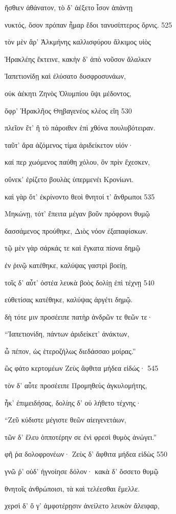 ἤσθιεν ἀθάνατον, τὸ δ' ἀέξετο ἶσον ἁπάντῃ 

νυκτός, ὅσον πρόπαν ἦμαρ ἔδοι τανυσίπτερος ὄρνις. 525 

τὸν μὲν ἄρ' Ἀλκμήνης καλλισφύρου ἄλκιμος υἱὸς

Ἡρακλέης ἔκτεινε, κακὴν δ' ἀπὸ νοῦσον ἄλαλκεν

Ἰαπετιονίδῃ καὶ ἐλύσατο δυσφροσυνάων, 

οὐκ ἀέκητι Ζηνὸς Ὀλυμπίου ὕψι μέδοντος,

ὄφρ' Ἡρακλῆος Θηβαγενέος κλέος εἴη 530

πλεῖον ἔτ' ἢ τὸ πάροιθεν ἐπὶ χθόνα πουλυβότειραν.

ταῦτ' ἄρα ἁζόμενος τίμα ἀριδείκετον υἱόν·

καί περ χωόμενος παύθη χόλου, ὃν πρὶν ἔχεσκεν,

οὕνεκ' ἐρίζετο βουλὰς ὑπερμενέι Κρονίωνι.

καὶ γὰρ ὅτ' ἐκρίνοντο θεοὶ θνητοί τ' ἄνθρωποι 535

Μηκώνῃ, τότ' ἔπειτα μέγαν βοῦν πρόφρονι θυμῷ

δασσάμενος προύθηκε, Διὸς νόον ἐξαπαφίσκων. 

τῷ μὲν γὰρ σάρκάς τε καὶ ἔγκατα πίονα δημῷ 

ἐν ῥινῷ κατέθηκε, καλύψας γαστρὶ βοείῃ,

τοῖς δ' αὖτ' ὀστέα λευκὰ βοὸς δολίῃ ἐπὶ τέχνῃ 540 

εὐθετίσας κατέθηκε, καλύψας ἀργέτι δημῷ. 

δὴ τότε μιν προσέειπε πατὴρ ἀνδρῶν τε θεῶν τε· 

``Ἰαπετιονίδη, πάντων ἀριδείκετ' ἀνάκτων, 

ὦ πέπον, ὡς ἑτεροζήλως διεδάσσαο μοίρας.'' 

ὣς φάτο κερτομέων Ζεὺς ἄφθιτα μήδεα εἰδώς· 545 

τὸν δ' αὖτε προσέειπε Προμηθεὺς ἀγκυλομήτης,

ἦκ' ἐπιμειδήσας, δολίης δ' οὐ λήθετο τέχνης· 

``Ζεῦ κύδιστε μέγιστε θεῶν αἰειγενετάων, 

τῶν δ' ἕλευ ὁπποτέρην σε ἐνὶ φρεσὶ θυμὸς ἀνώγει.'' 

φῆ ῥα δολοφρονέων· Ζεὺς δ' ἄφθιτα μήδεα εἰδὼς 550 

γνῶ ῥ' οὐδ' ἠγνοίησε δόλον· κακὰ δ' ὄσσετο θυμῷ 

θνητοῖς ἀνθρώποισι, τὰ καὶ τελέεσθαι ἔμελλε.

χερσὶ δ' ὅ γ' ἀμφοτέρῃσιν ἀνείλετο λευκὸν ἄλειφαρ, 

